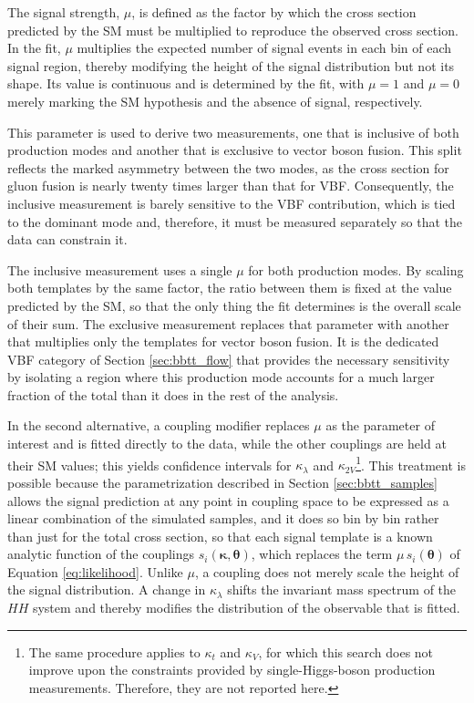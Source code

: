 
The signal strength, $\mu$, is defined as the factor by which the cross section predicted by the SM must be multiplied to reproduce the observed cross section. In the fit, $\mu$ multiplies the expected number of signal events in each bin of each signal region, thereby modifying the height of the signal distribution but not its shape. Its value is continuous and is determined by the fit, with $\mu = 1$ and $\mu = 0$ merely marking the SM hypothesis and the absence of signal, respectively.

This parameter is used to derive two measurements, one that is inclusive of both production modes and another that is exclusive to vector boson fusion. This split reflects the marked asymmetry between the two modes, as the cross section for gluon fusion is nearly twenty times larger than that for VBF. Consequently, the inclusive measurement is barely sensitive to the VBF contribution, which is tied to the dominant mode and, therefore, it must be measured separately so that the data can constrain it.

The inclusive measurement uses a single $\mu$ for both production modes. By scaling both templates by the same factor, the ratio between them is fixed at the value predicted by the SM, so that the only thing the fit determines is the overall scale of their sum. The exclusive measurement replaces that parameter with another that multiplies only the templates for vector boson fusion. It is the dedicated VBF category of Section \ref{sec:bbtt_flow} that provides the necessary sensitivity by isolating a region where this production mode accounts for a much larger fraction of the total than it does in the rest of the analysis.\medskip


In the second alternative, a coupling modifier replaces $\mu$ as the parameter of interest and is fitted directly to the data, while the other couplings are held at their SM values; this yields confidence intervals for $\kappa_\lambda$ and $\kappa_{2V}$\footnote{The same procedure applies to $\kappa_t$ and $\kappa_V$, for which this search does not improve upon the constraints provided by single-Higgs-boson production measurements. Therefore, they are not reported here.}. This treatment is possible because the parametrization described in Section \ref{sec:bbtt_samples} allows the signal prediction at any point in coupling space to be expressed as a linear combination of the simulated samples, and it does so bin by bin rather than just for the total cross section, so that each signal template is a known analytic function of the couplings $s_i(\boldsymbol{\kappa},\boldsymbol{\theta})$, which replaces the term $\mu\,s_i(\boldsymbol{\theta})$ of Equation \ref{eq:likelihood}. Unlike $\mu$, a coupling does not merely scale the height of the signal distribution. A change in $\kappa_\lambda$ shifts the invariant mass spectrum of the $HH$ system and thereby modifies the distribution of the observable that is fitted.



